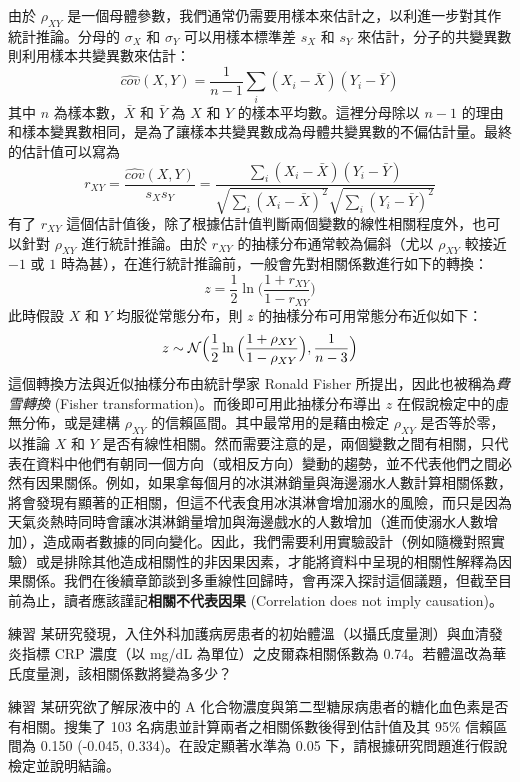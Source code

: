     由於 $\rho_{XY}$ 是一個母體參數，我們通常仍需要用樣本來估計之，以利進一步對其作統計推論。分母的 $\sigma_X$ 和 $\sigma_Y$ 可以用樣本標準差 $s_X$ 和 $s_Y$ 來估計，分子的共變異數則利用樣本共變異數來估計：
    \[\widehat{cov}(X,Y) = \frac{1}{n-1}\sum_i (X_i - \bar{X})(Y_i - \bar{Y})\]
    其中 $n$ 為樣本數，$\bar{X}$ 和 $\bar{Y}$ 為 $X$ 和 $Y$ 的樣本平均數。這裡分母除以 $n-1$ 的理由和樣本變異數相同，是為了讓樣本共變異數成為母體共變異數的不偏估計量。最終的估計值可以寫為
    \[r_{XY} = \frac{\widehat{cov}(X,Y)}{s_X s_Y} = \frac{\sum_i (X_i - \bar{X})(Y_i - \bar{Y})}{\sqrt{\sum_i (X_i - \bar{X})^2}\sqrt{\sum_i (Y_i - \bar{Y})^2}}\]
    有了 $r_{XY}$ 這個估計值後，除了根據估計值判斷兩個變數的線性相關程度外，也可以針對 $\rho_{XY}$ 進行統計推論。由於 $r_{XY}$ 的抽樣分布通常較為偏斜（尤以 $\rho_{XY}$ 較接近 $-1$ 或 $1$ 時為甚），在進行統計推論前，一般會先對相關係數進行如下的轉換：
    \[z = \frac{1}{2}\ln\Big(\frac{1+r_{XY}}{1-r_{XY}}\Big)\]
    此時假設 $X$ 和 $Y$ 均服從常態分布，則 $z$ 的抽樣分布可用常態分布近似如下：
    \[z \sim \mathcal{N}\Big(\frac{1}{2}\ln\Big(\frac{1+\rho_{XY}}{1-\rho_{XY}}\Big), \frac{1}{n-3}\Big)\]
    這個轉換方法與近似抽樣分布由統計學家 Ronald Fisher 所提出，因此也被稱為\textit{費雪轉換} (Fisher transformation)。而後即可用此抽樣分布導出 $z$ 在假說檢定中的虛無分佈，或是建構 $\rho_{XY}$ 的信賴區間。其中最常用的是藉由檢定 $\rho_{XY}$ 是否等於零，以推論 $X$ 和 $Y$ 是否有線性相關。然而需要注意的是，兩個變數之間有相關，只代表在資料中他們有朝同一個方向（或相反方向）變動的趨勢，並不代表他們之間必然有因果關係。例如，如果拿每個月的冰淇淋銷量與海邊溺水人數計算相關係數，將會發現有顯著的正相關，但這不代表食用冰淇淋會增加溺水的風險，而只是因為天氣炎熱時同時會讓冰淇淋銷量增加與海邊戲水的人數增加（進而使溺水人數增加），造成兩者數據的同向變化。因此，我們需要利用實驗設計（例如隨機對照實驗）或是排除其他造成相關性的非因果因素，才能將資料中呈現的相關性解釋為因果關係。我們在後續章節談到多重線性回歸時，會再深入探討這個議題，但截至目前為止，讀者應該謹記\textbf{相關不代表因果} (Correlation does not imply causation)。

    \bigskip

    \begin{custom}{練習}
        某研究發現，入住外科加護病房患者的初始體溫（以攝氏度量測）與血清發炎指標 CRP 濃度（以 mg/dL 為單位）之皮爾森相關係數為 0.74。若體溫改為華氏度量測，該相關係數將變為多少？
    \end{custom}

    \bigskip

    \begin{custom}{練習}
        某研究欲了解尿液中的 A 化合物濃度與第二型糖尿病患者的糖化血色素是否有相關。搜集了 103 名病患並計算兩者之相關係數後得到估計值及其 95\% 信賴區間為 0.150 (-0.045, 0.334)。在設定顯著水準為 0.05 下，請根據研究問題進行假說檢定並說明結論。
    \end{custom}

